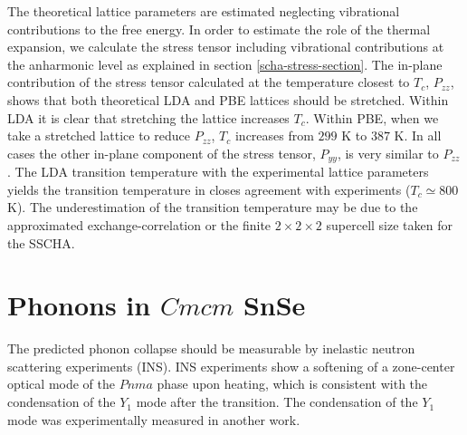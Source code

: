 The theoretical lattice parameters are estimated neglecting vibrational 
contributions to the free energy. In order to estimate the role of the thermal expansion, we calculate the stress tensor including vibrational contributions at the anharmonic level as explained in 
section \ref{scha-stress-section}. The in-plane contribution of the stress tensor calculated at the temperature closest to $T_{c}$, $P_{zz}$, shows that both theoretical LDA and PBE lattices should be stretched. Within LDA it 
is clear that stretching the lattice increases $T_{c}$. Within PBE, when we take a stretched lattice to reduce $P_{zz}$, $T_{c}$ increases from $299$ K to $387$ K. In all cases the other in-plane component of the stress tensor, 
$P_{yy}$, is very similar to $P_{zz}$. The LDA transition temperature with the experimental lattice parameters yields the transition temperature in closes agreement with experiments ($T_{c}\simeq800$ K). The underestimation of the 
transition temperature may be due to the approximated exchange-correlation or the finite $2\times2\times2$ supercell 
size taken for the SSCHA. \\

\section{Phonons in $Cmcm$ SnSe}

The predicted phonon collapse should be measurable by inelastic neutron scattering experiments (INS). INS experiments\cite{li2015orbitally} show a softening of a zone-center optical mode of the $Pnma$ phase upon heating, which
is consistent with the condensation of the $Y_{1}$ mode after the transition. The condensation of the $Y_{1}$ mode 
was experimentally measured in another work\cite{chatterji2018soft}. \\

